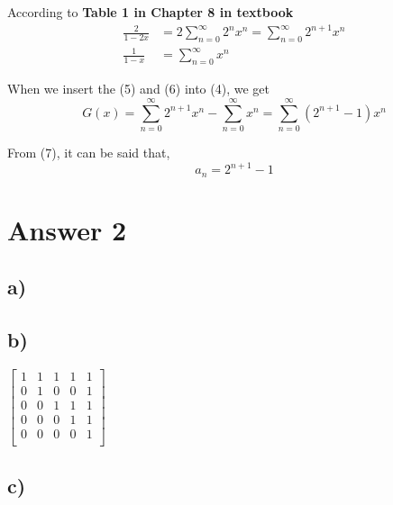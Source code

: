 \documentclass[12pt]{article}
\begin{document}
\noindent According to \textbf{Table 1 in Chapter 8 in textbook}
\begin{align}
    \frac{2}{1-2x} &= 2 \sum_{n=0}^{\infty} 2^{n}x^{n} = \sum_{n=0}^{\infty} 2^{n+1}x^{n}\\
    \frac{1}{1-x} &= \sum_{n=0}^{\infty} x^{n}
\end{align}

\noindent When we insert the (5) and (6) into (4), we get
\begin{equation}
    G(x) = \sum_{n=0}^{\infty} 2^{n+1}x^{n} - \sum_{n=0}^{\infty} x^{n} = \sum_{n=0}^{\infty} (2^{n+1}-1)x^{n}
\end{equation}

\noindent From (7), it can be said that,
\begin{equation*}
    a_n = 2^{n+1} - 1
\end{equation*}


\newpage
\section*{Answer 2}

\subsection*{a)}


\subsection*{b)}

$\begin{bmatrix}
1 & 1 & 1 & 1 & 1\\
0 & 1 & 0 & 0 & 1\\
0 & 0 & 1 & 1 & 1\\
0 & 0 & 0 & 1 & 1\\
0 & 0 & 0 & 0 & 1\\
\end{bmatrix}$

\subsection*{c)}
\end{document}
